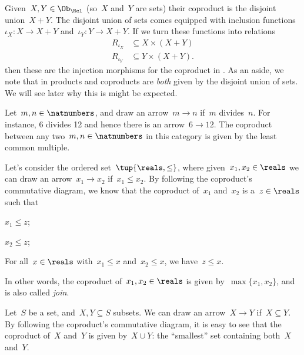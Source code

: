 \begin{example}
  Given~$X,Y\in \Ob_\Rel$ (so~$X$ and~$Y$ are sets) their coproduct is the disjoint union~$X+Y$. The disjoint union of sets comes equipped with inclusion functions~$\iota_X\colon X\to X+Y$ and~$\iota_Y\colon Y\to X+Y$. If we turn these functions into relations
  \begin{equation*}
    \begin{aligned}
      R_{\iota_X}&\subseteq X\times (X+Y)\\
      R_{\iota_Y}&\subseteq Y\times (X+Y).
    \end{aligned}
  \end{equation*}
  then these are the injection morphisms for the coproduct in \Rel.
  As an aside, we note that in \Rel products and coproducts are \emph{both} given by the disjoint union of sets. We will see later why this is might be expected.
\end{example}

\begin{example}
  Let~$m,n\in \natnumbers$, and draw an arrow~$m\to n$ if~$m$ divides~$n$. For instance, 6 divides 12 and hence there is an arrow~$6\to 12$. The coproduct between any two~$m,n\in \natnumbers$ in this category is given by the least common multiple.
\end{example}

\begin{example}
  Let's consider the ordered set~$\tup{\reals,\leq}$, where given~$x_1,x_2\in \reals$ we can draw an arrow~$x_1\to x_2$ if~$x_1\leq x_2$. By following the coproduct's commutative diagram, we know that the coproduct of~$x_1$ and~$x_2$ is a~$z\in \reals$ such that
  \begin{compactitem}
    \item $x_1\leq z$;
    \item $x_2\leq z$;
    \item For all~$x\in \reals$ with~$x_1\leq x$ and~$x_2\leq x$, we have~$z\leq x$.
  \end{compactitem}
  In other words, the coproduct of~$x_1,x_2\in \reals$ is given by~$\max\{x_1,x_2\}$, and is also called \emph{join}.
\end{example}

\begin{example}
  \label{ex:subset_coprod}
  Let~$S$ be a set, and~$X,Y\subseteq S$ subsets. We can draw an arrow~$X\to Y$ if~$X\subseteq Y$. By following the coproduct's commutative diagram, it is easy to see that the coproduct of~$X$ and~$Y$ is given by~$X\cup Y$: the ``smallest'' set containing both~$X$ and~$Y$.
\end{example}

